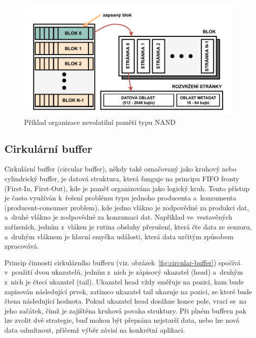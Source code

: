 \begin{figure}[h]
    \centering
    \includegraphics[width=1.00\textwidth]{obrazky-figures/nand-architecture-1.pdf}
    
    \caption{Příklad organizace nevolatilní paměti typu NAND~\cite{nand_flash_structure}}
    \label{fig:batch-processing}
\end{figure}

\newpage

\subsection{Cirkulární buffer}
\label{cirkularni_buffer}
Cirkulární buffer (circular buffer), někdy také označovaný jako kruhový nebo cylindrický buffer, je datová struktura, která funguje na principu FIFO fronty (First-In, First-Out), kde je paměť organizována jako logický kruh. Tento přístup je často využíván k~řešení problému typu jednoho producenta a~konzumenta (producent-consumer problem), kde jedno vlákno je zodpovědné za produkci dat, a~druhé vlákno je zodpovědné za konzumaci dat. Například ve~vestavěných zařízeních, jedním z~vláken je rutina obsluhy přerušení, která čte data ze senzoru, a~druhým vláknem je hlavní smyčka události, která data určitým způsobem zpracovává.~\cite{embedjournal_ring_buffer}

Princip činnosti cirkulárního bufferu (viz. obrázek~\ref{fig:circular-buffer}) spočívá v~použití dvou ukazatelů, jedním z~nich je zápisový ukazatel (head) a~druhým z~nich je čtecí ukazatel (tail). Ukazatel head vždy směřuje na pozici, kam bude zapisován následující prvek, zatímco ukazatel tail ukazuje na pozici, ze které bude čtena následující hodnota. Pokud ukazatel head dosáhne konce pole, vrací se~na jeho začátek, čímž je zajištěna kruhová povaha struktury. Při plném bufferu pak lze zvolit dvě strategie, buď mohou být přepsána nejstarší data, nebo lze nová data odmítnout, přičemž výběr závisí na konkrétní aplikaci.~\cite{embedjournal_ring_buffer, medium_ring_buffer}

